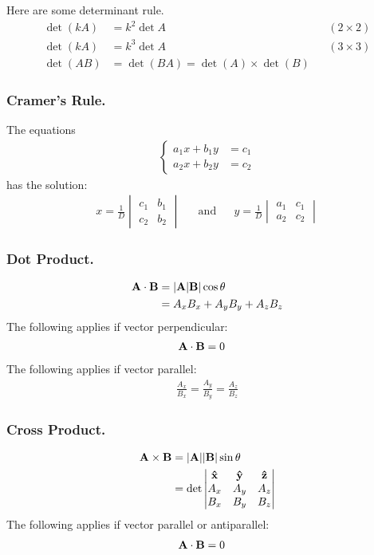 \documentclass[../main.tex]{subfiles}
\begin{document}
Here are some determinant rule.
\begin{align*}
	\det(kA) & =k^2\det A                      &  & (2\times2) \\
	\det(kA) & =k^3\det A                      &  & (3\times3) \\
	\det(AB) & =\det(BA)=\det(A)\times\det (B)
\end{align*}

\subsubsection*{Cramer's Rule.} The equations
\begin{align*}
	\begin{cases}
		a_1x+b_1y & =c_1 \\
		a_2x+b_2y & =c_2
	\end{cases}
\end{align*}
has the solution:
\begin{align*}
	x=\frac{1}{D}
	\begin{vmatrix}
		c_1 & b_1 \\
		c_2 & b_2
	\end{vmatrix} &  & \mathrm{and} &  &
	y=\frac{1}{D}
	\begin{vmatrix}
		a_1 & c_1 \\
		a_2 & c_2
	\end{vmatrix}
\end{align*}

\subsubsection*{Dot Product.}
\begin{align*}
	\mathbf{A}\cdot\mathbf{B} & =|\mathbf{A}|\mathbf{B}|\cos\theta    \\
	          & =A_xB_x+A_yB_y+A_zB_z
\end{align*}
The following applies if vector perpendicular:
\begin{align*}
	\mathbf{A}\cdot\mathbf{B} & =0
\end{align*}
The following applies if vector parallel:
\begin{align*}
	\frac{A_x}{B_x}=\frac{A_y}{B_y}=\frac{A_z}{B_z}
\end{align*}

\subsubsection*{Cross Product.}
\begin{align*}
	\mathbf{A}\times\mathbf{B} & =|\mathbf{A}||\mathbf{B}|\sin\theta  \\
	           & =\det\begin{vmatrix}
		                  \mathbf{\hat{x}}  & \mathbf{\hat{y}}  & \mathbf{\hat{z}}  \\
		                  A_x & A_y & A_z \\
		                  B_x & B_y & B_z
	                  \end{vmatrix}
\end{align*}
The following applies if vector parallel or antiparallel:
\begin{align*}
	\mathbf{A}\cdot\mathbf{B} & =0
\end{align*}
\end{document}
